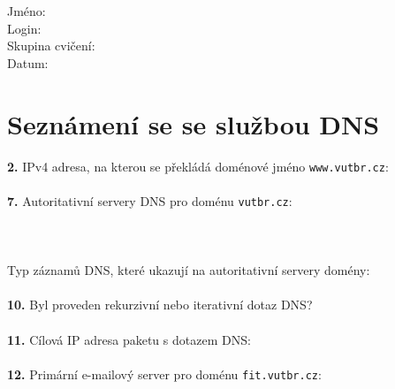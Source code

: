 Jméno:\\
Login:\\
Skupina cvičení:\\
Datum:\\

\section{Seznámení se se službou DNS}
\textbf{2.} IPv4 adresa, na kterou se překládá doménové jméno {\tt www.vutbr.cz}: \underline{\hspace{4.5cm}}
~\\
~\\
\textbf{7.} 
Autoritativní servery DNS pro doménu \texttt{vutbr.cz}:
\\
\\
\\
\\
\hspace*{0.5cm}Typ záznamů DNS, které ukazují na autoritativní servery domény:
\underline{\hspace{2cm}}
~\\
~\\
\textbf{10.} Byl proveden rekurzivní nebo iterativní dotaz DNS?
\underline{\hspace{4cm}}
\\
\\
\textbf{11.} Cílová IP adresa paketu s dotazem DNS:
\underline{\hspace{4cm}}
\\
\\
\textbf{12.} Primární e-mailový server pro doménu \texttt{fit.vutbr.cz}:
\underline{\hspace{4cm}}

